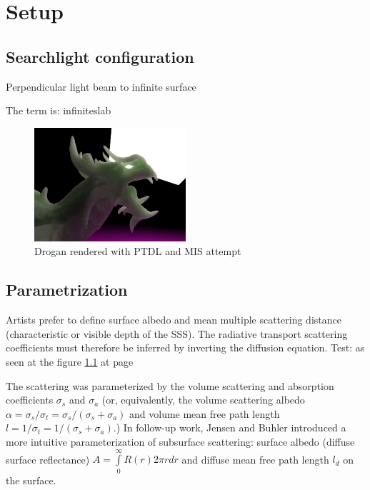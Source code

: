 \chapter{Setup}
\label{chapter:Setup}

\section{Searchlight configuration}
Perpendicular light beam to infinite surface \cite{Jacques1995}

The term is: \gls{infiniteslab}

\begin{figure}%
    \centering
    \includegraphics[width=0.5\textwidth]{"imgs/renders/dragon_ptdl"}
    \caption{Drogan rendered with PTDL and MIS attempt}
    \label{fig:dragon_ptdl}
\end{figure}

\section{Parametrization}
Artists prefer to define surface albedo and mean multiple scattering distance
(characteristic or visible depth of the SSS). The radiative transport scattering
coefficients must therefore be inferred by inverting the diffusion equation.
Test: as seen at the figure \ref{fig:dragon_ptdl} at page \pageref{fig:dragon_ptdl}

The scattering was parameterized by the volume scattering and absorption
coefficients $\sigma_s$ and $\sigma_a$ (or, equivalently, the volume
scattering albedo $\alpha = \sigma_s/\sigma_t = \sigma_s/(\sigma_s + \sigma_a)$
and volume mean free path length $l = 1/\sigma_t = 1/(\sigma_s + \sigma_a)$.)
In follow-up work, Jensen and Buhler \cite{Jensen:2002:RHR:566570.566619}
introduced a more intuitive parameterization of subsurface scattering:
surface albedo (diffuse surface reflectance) $A = \int\limits_0^\infty
R(r)2\pi r dr$ and diffuse mean free path length $l_d$ on the surface.

